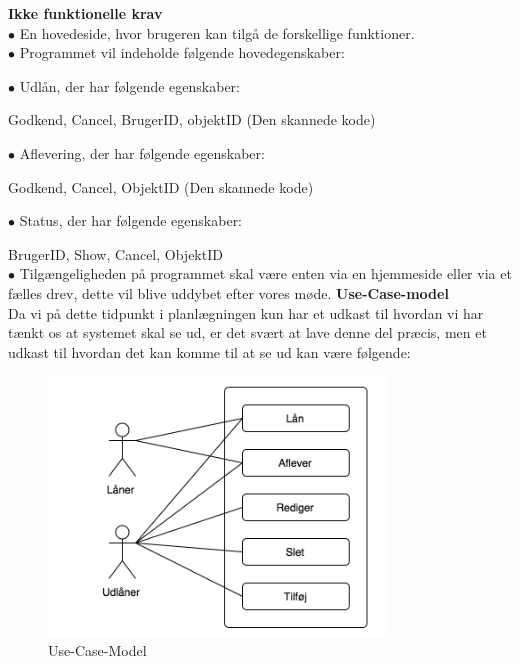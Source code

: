 \documentclass[a4paper]{article}
\begin{document}
\textbf{Ikke funktionelle krav}\\
$\bullet$ En hovedeside, hvor brugeren kan tilgå de forskellige funktioner.\\
$\bullet$ Programmet vil indeholde  følgende hovedegenskaber:

	$\bullet$ Udlån, der har følgende egenskaber: 

		Godkend, Cancel, BrugerID, objektID (Den skannede kode)

	$\bullet$ Aflevering, der har følgende egenskaber:

		Godkend, Cancel, ObjektID (Den skannede kode)

	$\bullet$ Status, der har følgende egenskaber:

		BrugerID, Show, Cancel, ObjektID\\
$\bullet$ Tilgængeligheden på programmet skal være enten via en hjemmeside eller via et fælles drev, dette vil blive uddybet efter vores møde.
\newpage
\textbf{Use-Case-model}\\
Da vi på dette tidpunkt i planlægningen kun har et udkast til hvordan vi har tænkt os at systemet skal se ud, er det svært at lave denne del præcis, men et udkast til hvordan det kan komme til at se ud kan være følgende:\\
\begin{figure}[h!]
  \caption{Use-Case-Model}
  \centering
    \includegraphics[width=0.8\textwidth]{UseCaseModel}
\end{figure} 
\end{document}

